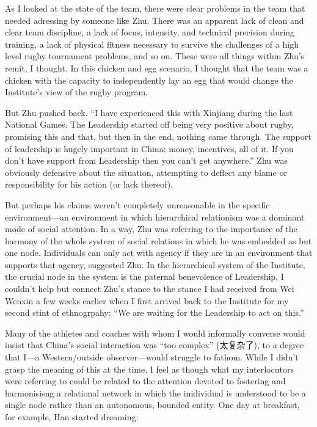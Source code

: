 As I looked at the state of the team, there were clear problems in the team that needed adressing by someone like Zhu.  There was an apparent lack of clean and clear team discipline, a lack of focus, intensity, and technical precision during training, a lack of physical fitness necessary to survive the challenges of a high level rugby tournament problems, and so on.  These were all things within Zhu's remit, I thought.  In this chicken and egg scenario, I thought that the team was a chicken with the capacity to independently lay an egg that would change the Institute's view of the rugby program.

But Zhu pushed back. ``I have experienced this with Xinjiang during the last National Games. The Leadership started off being very positive about rugby, promising this and that, but then in the end, nothing came through.  The support of leadership is hugely important in China: money, incentives, all of it.  If you don't have support from Leadership then you can't get anywhere.''  Zhu was obviously defensive about the situation, attempting to deflect any blame or responsibility for his action (or lack thereof).

But perhaps his claims weren't completely unreasonable in the specific environment---an environment in which hierarchical relationism was a dominant mode of social attention.  In a way, Zhu was referring to the importance of the harmony of the whole system of social relations in which he was embedded as but one node. Individuals can only act with agency if they are in an environment that supports that agency, suggested Zhu. In the hierarchical system of the Institute, the crucial node in the system is the paternal benevolence of Leadership.  I couldn't help but connect Zhu's stance to the stance I had received from Wei Wenxin a few weeks earlier when I first arrived back to the Institute for my second stint of ethnogrpahy: ``We are waiting for the Leadership to act on this.''


Many of the athletes and coaches with whom I would informally converse would insist that China's social interaction was ``too complex'' (太复杂了), to a degree that I---a Western/outside observer---would struggle to fathom.  While I didn't grasp the meaning of this at the time, I feel as though what my interlocutors were referring to could be related to the attention devoted to fostering and harmonisisng a relational network in which the inidividual is understood to be a single node rather than an autonomous, bounded entity. One day at breakfast, for example, Han started dreaming:

